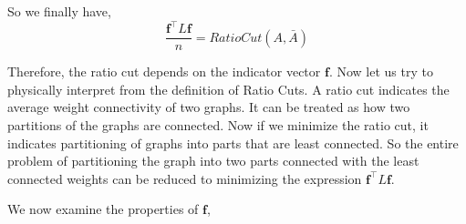 \documentclass[english]{article}
\theoremstyle{plain}
\begin{document}
So we finally have,
\begin{equation}
\frac{\boldsymbol{f}^{\top}L\boldsymbol{f}}{n} = Ratio Cut(A,\bar{A})
\end{equation}

Therefore, the ratio cut depends on the indicator vector $\boldsymbol{f}$. Now let us try to physically interpret from the definition of Ratio Cuts. A ratio cut indicates the average weight connectivity of two graphs. It can be treated as how two partitions of the graphs are connected. Now if we minimize the ratio cut, it indicates partitioning of graphs into parts that are least connected. So the entire problem of partitioning the graph into two parts connected with the least connected weights can be reduced to minimizing the expression $\boldsymbol{f}^{\top}L\boldsymbol{f}$.

We now examine the properties of $\boldsymbol{f}$,
\end{document}
